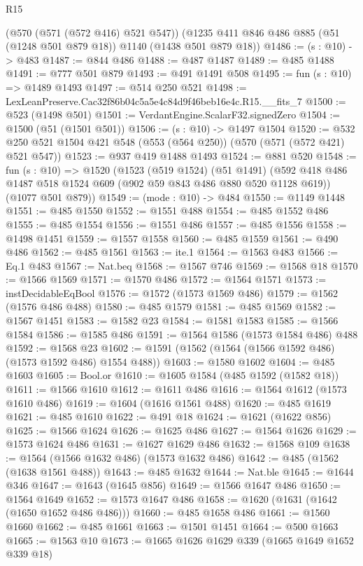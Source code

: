 \begin{lexlean}{R15}
\begin{coremodule}
    (@570 (@571 (@572 @416) @521 @547))
    (@1235 @411 @846 @486 @885 (@51 (@1248 @501 @879 @18)) @1140 (@1438 @501 @879 @18))
@1486 := (s : @10) -> @483
@1487 := @844 @486
@1488 := @487 @1487
@1489 := @485 @1488
@1491 := @777 @501 @879
@1493 := @491 @1491 @508
@1495 := fun (s : @10) => @1489 @1493
@1497 := @514 @250 @521
@1498 := LexLeanPreserve.Cac32f86b04c5a5e4c84d9f46beb16e4c.R15.__fits_7
@1500 := @523 (@1498 @501)
@1501 := VerdantEngine.ScalarF32.signedZero
@1504 := @1500 (@51 (@1501 @501))
@1506 := (s : @10) -> @1497 @1504
@1520 := @532 @250 @521 @1504 @421 @548 (@553 (@564 @250)) (@570 (@571 (@572 @421) @521 @547))
@1523 := @937 @419 @1488 @1493
@1524 := @881 @520
@1548 := fun (s : @10) =>
  @1520
    (@1523
      (@519 @1524)
      (@51 @1491)
      (@592 @418 @486 @1487 @518 @1524 @609 (@902 @59 @843 @486 @880 @520 @1128 @619))
      (@1077 @501 @879))
@1549 := (mode : @10) -> @484
@1550 := @1149 @1448
@1551 := @485 @1550
@1552 := @1551 @488
@1554 := @485 @1552 @486
@1555 := @485 @1554
@1556 := @1551 @486
@1557 := @485 @1556
@1558 := @1498 @1451
@1559 := @1557 @1558
@1560 := @485 @1559
@1561 := @490 @486
@1562 := @485 @1561
@1563 := ite.{1}
@1564 := @1563 @483
@1566 := Eq.{1} @483
@1567 := Nat.beq
@1568 := @1567 @746
@1569 := @1568 @18
@1570 := @1566 @1569
@1571 := @1570 @486
@1572 := @1564 @1571
@1573 := instDecidableEqBool
@1576 := @1572 (@1573 @1569 @486)
@1579 := @1562 (@1576 @486 @488)
@1580 := @485 @1579
@1581 := @485 @1569
@1582 := @1567 @1451
@1583 := @1582 @23
@1584 := @1581 @1583
@1585 := @1566 @1584
@1586 := @1585 @486
@1591 := @1564 @1586 (@1573 @1584 @486) @488
@1592 := @1568 @23
@1602 := @1591 (@1562 (@1564 (@1566 @1592 @486) (@1573 @1592 @486) @1554 @488))
@1603 := @1580 @1602
@1604 := @485 @1603
@1605 := Bool.or
@1610 := @1605 @1584 (@485 @1592 (@1582 @18))
@1611 := @1566 @1610
@1612 := @1611 @486
@1616 := @1564 @1612 (@1573 @1610 @486)
@1619 := @1604 (@1616 @1561 @488)
@1620 := @485 @1619
@1621 := @485 @1610
@1622 := @491 @18
@1624 := @1621 (@1622 @856)
@1625 := @1566 @1624
@1626 := @1625 @486
@1627 := @1564 @1626
@1629 := @1573 @1624 @486
@1631 := @1627 @1629 @486
@1632 := @1568 @109
@1638 := @1564 (@1566 @1632 @486) (@1573 @1632 @486)
@1642 := @485 (@1562 (@1638 @1561 @488))
@1643 := @485 @1632
@1644 := Nat.ble
@1645 := @1644 @346
@1647 := @1643 (@1645 @856)
@1649 := @1566 @1647 @486
@1650 := @1564 @1649
@1652 := @1573 @1647 @486
@1658 := @1620 (@1631 (@1642 (@1650 @1652 @486 @486)))
@1660 := @485 @1658 @486
@1661 := @1560 @1660
@1662 := @485 @1661
@1663 := @1501 @1451
@1664 := @500 @1663
@1665 := @1563 @10
@1673 := @1665 @1626 @1629 @339 (@1665 @1649 @1652 @339 @18)

\end{coremodule}
\end{lexlean}
